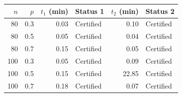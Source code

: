 \begin{tabular}{rr rlr l}
\toprule
$n$ & $p$ & $t_1$ (min) & Status 1 & $t_2$ (min) & Status 2 \\
\midrule
80 & 0.3 & 0.03 & Certified & 0.10 & Certified \\
80 & 0.5 & 0.05 & Certified & 0.04 & Certified \\
80 & 0.7 & 0.15 & Certified & 0.05 & Certified \\
100 & 0.3 & 0.05 & Certified & 0.09 & Certified \\
100 & 0.5 & 0.15 & Certified & 22.85 & Certified \\
100 & 0.7 & 0.18 & Certified & 0.07 & Certified \\
\bottomrule
\end{tabular}
